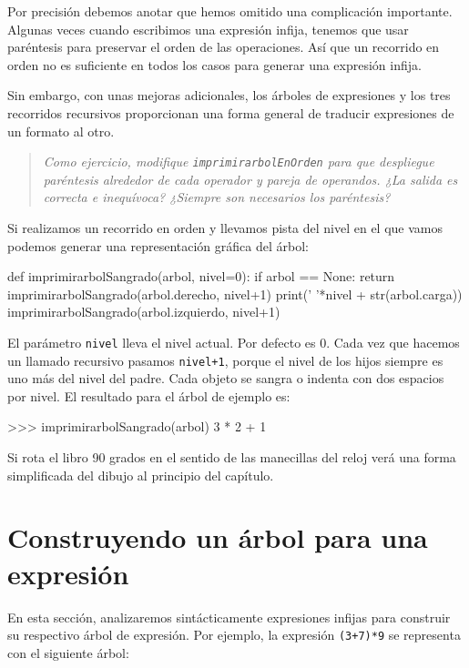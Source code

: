 Por precisión debemos anotar que hemos omitido una complicación importante.
Algunas veces cuando escribimos una expresión infija, tenemos que
usar paréntesis para preservar el orden de las operaciones. Así que
un recorrido en orden no es suficiente en todos los casos para generar
una expresión infija.

Sin embargo, con unas mejoras adicionales, los árboles de expresiones
y los tres recorridos recursivos proporcionan una forma general de
traducir expresiones de un formato al otro.
\begin{quote}
{\em Como ejercicio, modifique \texttt{imprimirarbolEnOrden} para
que despliegue paréntesis alrededor de cada operador y pareja de operandos.
¿La salida es correcta e inequívoca? ¿Siempre son necesarios los paréntesis?
} 
\end{quote}
Si realizamos un recorrido en orden y llevamos pista del nivel en
el que vamos podemos generar una representación gráfica del árbol:

\beforeverb 
\begin{pythoncode}
def imprimirarbolSangrado(arbol, nivel=0):
  if arbol == None: 
     return
  imprimirarbolSangrado(arbol.derecho, nivel+1)
  print('  '*nivel + str(arbol.carga))
  imprimirarbolSangrado(arbol.izquierdo, nivel+1)
\end{pythoncode}
\afterverb El parámetro \texttt{nivel} lleva el nivel actual. Por
defecto es 0. Cada vez que hacemos un llamado recursivo pasamos \texttt{nivel+1},
porque el nivel de los hijos siempre es uno más del nivel del padre.
Cada objeto se sangra o indenta con dos espacios por nivel. El resultado
para el árbol de ejemplo es:

\beforeverb 
\begin{pyconcode}
>>> imprimirarbolSangrado(arbol)
    3
  *
    2
+
  1
\end{pyconcode}
\afterverb Si rota el libro 90 grados en el sentido de las manecillas
del reloj verá una forma simplificada del dibujo al principio del
capítulo.

\section{Construyendo un árbol para una expresión}

  

En esta sección, analizaremos sintácticamente expresiones infijas
para construir su respectivo árbol de expresión. Por ejemplo, la expresión
\texttt{(3+7){*}9} se representa con el siguiente árbol:

